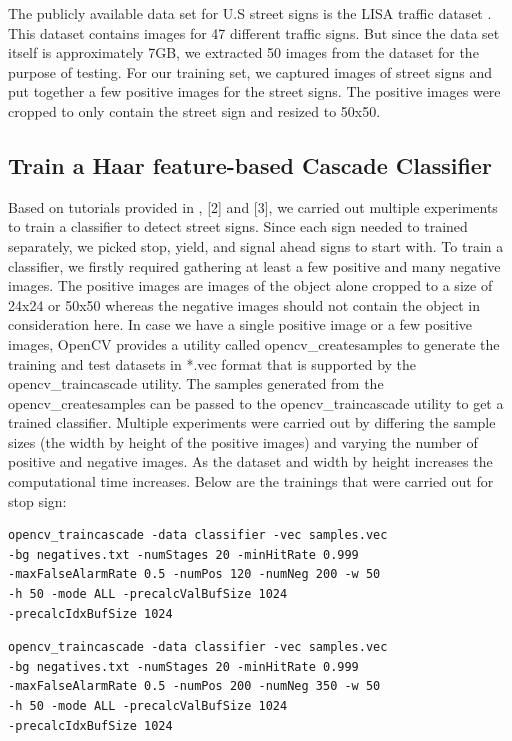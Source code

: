 \documentclass[9pt,twocolumn,twoside]{../../styles/osajnl}
\begin{document}
The publicly available data set for U.S street signs is the LISA
traffic dataset \cite{paper-lisadataset}. This dataset contains images
for 47 different traffic signs. But since the data set itself is
approximately 7GB, we extracted 50 images from the dataset for the
purpose of testing. For our training set, we captured images of street
signs and put together a few positive images for the street signs. The
positive images were cropped to only contain the street sign and
resized to 50x50.

\subsection{Train a Haar feature-based Cascade Classifier}

Based on tutorials provided in \cite{www-coding-robin}, [2] and [3],
we carried out multiple experiments to train a classifier to detect
street signs. Since each sign needed to trained separately, we picked
stop, yield, and signal ahead signs to start with. To train a
classifier, we firstly required gathering at least a few positive and
many negative images. The positive images are images of the object
alone cropped to a size of 24x24 or 50x50 whereas the negative images
should not contain the object in consideration here. In case we have a
single positive image or a few positive images, OpenCV provides a
utility called opencv\_createsamples to generate the training and test
datasets in *.vec format that is supported by the opencv\_traincascade
utility. The samples generated from the opencv\_createsamples can be
passed to the opencv\_traincascade utility to get a trained
classifier.  Multiple experiments were carried out by differing the
sample sizes (the width by height of the positive images) and varying
the number of positive and negative images. As the dataset and width
by height increases the computational time increases. Below are the
trainings that were carried out for stop sign:

\begin{verbatim}
opencv_traincascade -data classifier -vec samples.vec 
-bg negatives.txt -numStages 20 -minHitRate 0.999 
-maxFalseAlarmRate 0.5 -numPos 120 -numNeg 200 -w 50 
-h 50 -mode ALL -precalcValBufSize 1024
-precalcIdxBufSize 1024
\end{verbatim}

\begin{verbatim}
opencv_traincascade -data classifier -vec samples.vec 
-bg negatives.txt -numStages 20 -minHitRate 0.999 
-maxFalseAlarmRate 0.5 -numPos 200 -numNeg 350 -w 50 
-h 50 -mode ALL -precalcValBufSize 1024
-precalcIdxBufSize 1024
\end{verbatim}
\end{document}
